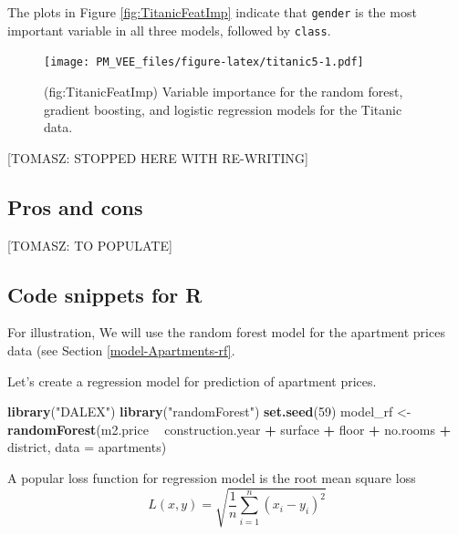 \documentclass[12pt,]{krantz}
\newenvironment{Shaded}{\begin{snugshade}}{\end{snugshade}}
\newcommand{\DataTypeTok}[1]{\textcolor[rgb]{0.13,0.29,0.53}{#1}}
\newcommand{\DecValTok}[1]{\textcolor[rgb]{0.00,0.00,0.81}{#1}}
\newcommand{\KeywordTok}[1]{\textcolor[rgb]{0.13,0.29,0.53}{\textbf{#1}}}
\newcommand{\NormalTok}[1]{#1}
\newcommand{\OperatorTok}[1]{\textcolor[rgb]{0.81,0.36,0.00}{\textbf{#1}}}
\newcommand{\StringTok}[1]{\textcolor[rgb]{0.31,0.60,0.02}{#1}}
\begin{document}
The plots in Figure \ref{fig:TitanicFeatImp} indicate that \texttt{gender} is the most important variable in all three models, followed by \texttt{class}.

\begin{figure}
\centering
\texttt{[image: PM\_VEE\_files/figure-latex/titanic5-1.pdf]}
\caption{\label{fig:titanic5}(fig:TitanicFeatImp) Variable importance for the random forest, gradient boosting, and logistic regression models for the Titanic data.}
\end{figure}

{[}TOMASZ: STOPPED HERE WITH RE-WRITING{]}

\hypertarget{featureImportanceProsCons}{%
\subsection{Pros and cons}\label{featureImportanceProsCons}}

{[}TOMASZ: TO POPULATE{]}

\hypertarget{featureImportanceR}{%
\subsection{Code snippets for R}\label{featureImportanceR}}

For illustration, We will use the random forest model for the apartment prices data (see Section \ref{model-Apartments-rf}.

Let's create a regression model for prediction of apartment prices.

\begin{Shaded}
\begin{Highlighting}[]
\KeywordTok{library}\NormalTok{(}\StringTok{"DALEX"}\NormalTok{)}
\KeywordTok{library}\NormalTok{(}\StringTok{"randomForest"}\NormalTok{)}
\KeywordTok{set.seed}\NormalTok{(}\DecValTok{59}\NormalTok{)}
\NormalTok{model_rf <-}\StringTok{ }\KeywordTok{randomForest}\NormalTok{(m2.price }\OperatorTok{~}\StringTok{ }\NormalTok{construction.year }\OperatorTok{+}\StringTok{ }\NormalTok{surface }\OperatorTok{+}\StringTok{ }\NormalTok{floor }\OperatorTok{+}\StringTok{ }
\StringTok{                           }\NormalTok{no.rooms }\OperatorTok{+}\StringTok{ }\NormalTok{district, }\DataTypeTok{data =}\NormalTok{ apartments)}
\end{Highlighting}
\end{Shaded}

A popular loss function for regression model is the root mean square loss
\[
  L(x, y) = \sqrt{\frac1n \sum_{i=1}^n (x_i - y_i)^2}
\]
\end{document}
